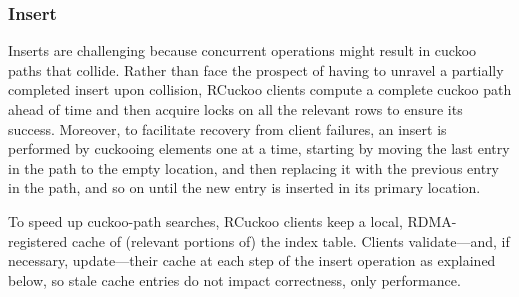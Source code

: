 
\subsubsection{Insert}
\label{sec:insert}

Inserts are challenging because concurrent operations might result in
cuckoo paths that collide.  Rather than face the prospect of having to
unravel a partially completed insert upon collision, RCuckoo clients
compute a complete cuckoo path ahead of time and then acquire locks on
all the relevant rows to ensure its success.  Moreover, to facilitate
recovery from client failures, an insert is performed by cuckooing
elements one at a time, starting by moving the last entry in the path
to the empty location, and then replacing it with the previous
entry in the path, and so on until the new entry is inserted in its primary location.


To speed up cuckoo-path searches, RCuckoo clients keep a local,
RDMA-registered cache of (relevant portions of) the index table.
Clients validate---and, if necessary, update---their cache at each
step of the insert operation as explained below, so stale cache
entries do not impact correctness, only performance.







